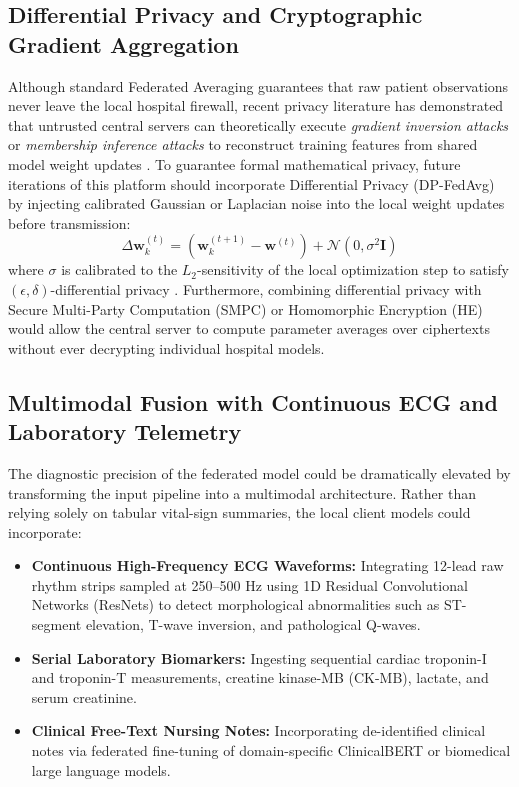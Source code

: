 \documentclass[12pt,a4paper,oneside]{report}
\begin{document}
\subsection{Differential Privacy and Cryptographic Gradient Aggregation}
Although standard Federated Averaging guarantees that raw patient observations never leave the local hospital firewall, recent privacy literature has demonstrated that untrusted central servers can theoretically execute \textit{gradient inversion attacks} or \textit{membership inference attacks} to reconstruct training features from shared model weight updates \citep{shokri2017membership}. To guarantee formal mathematical privacy, future iterations of this platform should incorporate Differential Privacy (DP-FedAvg) by injecting calibrated Gaussian or Laplacian noise into the local weight updates before transmission:
\begin{equation}
    \Delta \mathbf{w}_k^{(t)} = \left(\mathbf{w}_k^{(t+1)} - \mathbf{w}^{(t)}\right) + \mathcal{N}\left(0, \sigma^2 \mathbf{I}\right)
\end{equation}
where $\sigma$ is calibrated to the $L_2$-sensitivity of the local optimization step to satisfy $(\epsilon, \delta)$-differential privacy \citep{dwork2014algorithmic}. Furthermore, combining differential privacy with Secure Multi-Party Computation (SMPC) or Homomorphic Encryption (HE) would allow the central server to compute parameter averages over ciphertexts without ever decrypting individual hospital models.

\subsection{Multimodal Fusion with Continuous ECG and Laboratory Telemetry}
The diagnostic precision of the federated model could be dramatically elevated by transforming the input pipeline into a multimodal architecture. Rather than relying solely on tabular vital-sign summaries, the local client models could incorporate:
\begin{itemize}
    \item \textbf{Continuous High-Frequency ECG Waveforms:} Integrating 12-lead raw rhythm strips sampled at 250--500 Hz using 1D Residual Convolutional Networks (ResNets) to detect morphological abnormalities such as ST-segment elevation, T-wave inversion, and pathological Q-waves.
    \item \textbf{Serial Laboratory Biomarkers:} Ingesting sequential cardiac troponin-I and troponin-T measurements, creatine kinase-MB (CK-MB), lactate, and serum creatinine.
    \item \textbf{Clinical Free-Text Nursing Notes:} Incorporating de-identified clinical notes via federated fine-tuning of domain-specific ClinicalBERT or biomedical large language models.
\end{itemize}
\end{document}
